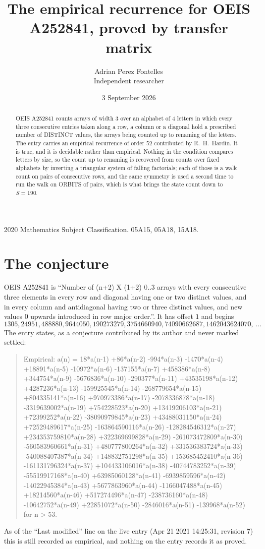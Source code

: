 \documentclass[11pt,a4paper]{article}
\title{The empirical recurrence for OEIS A252841, proved by transfer matrix}
\author{Adrian Perez Fontelles\\ \small Independent researcher}
\date{3 September 2026}
\theoremstyle{plain}
\theoremstyle{definition}
\begin{document}
\maketitle

\begin{abstract}
OEIS A252841 counts arrays of width $3$ over an alphabet of $4$ letters in which every three
consecutive entries taken along a row, a column or a diagonal hold a prescribed number of
DISTINCT values, the arrays being counted up to renaming of the letters. The entry carries an
empirical recurrence of order $52$ contributed by R.~H.~Hardin. It is true, and it is
decidable rather than empirical. Nothing in the condition compares letters by size, so the
count up to renaming is recovered from counts over fixed alphabets by inverting a triangular
system of falling factorials; each of those is a walk count on pairs of consecutive rows, and
the same symmetry is used a second time to run the walk on ORBITS of pairs, which is what
brings the state count down to $S=190$.
\end{abstract}

\noindent\small 2020 Mathematics Subject Classification. 05A15, 05A18, 15A18.\normalsize

\section{The conjecture}

OEIS A252841 is ``Number of (n+2) X (1+2) 0..3 arrays with every consecutive three elements in every row and diagonal having one or two distinct values, and in every column and antidiagonal having two or three distinct values, and new values 0 upwards introduced in row major order.''. It has offset $1$ and begins
\[
1305, 24951, 488880, 9644050, 190273279, 3754660940, 74090662687, 1462043624070,\ \dots
\]
The entry states, as a conjecture contributed by its author and never marked settled:
\begin{quote}
Empirical: a(n) = 18*a(n-1) +86*a(n-2) -994*a(n-3) -1470*a(n-4) +18891*a(n-5) -10972*a(n-6) -137155*a(n-7) +458386*a(n-8) +344754*a(n-9) -5676836*a(n-10) -290377*a(n-11) +43535198*a(n-12) +4287236*a(n-13) -159925545*a(n-14) -268779654*a(n-15) +804335141*a(n-16) +970973386*a(n-17) -2078336878*a(n-18) -3319639002*a(n-19) +754228523*a(n-20) +13419206103*a(n-21) +72399252*a(n-22) -38090979845*a(n-23) +43488031150*a(n-24) +72529489617*a(n-25) -163864590116*a(n-26) -128284546312*a(n-27) +234353759810*a(n-28) +322369699828*a(n-29) -261073472809*a(n-30) -560583960661*a(n-31) +480777800264*a(n-32) +331536383724*a(n-33) -540088407387*a(n-34) +148832751298*a(n-35) +153685452410*a(n-36) -161131796324*a(n-37) +104433106016*a(n-38) -40744783252*a(n-39) -55519917168*a(n-40) +63985060128*a(n-41) -6939859596*a(n-42) -14022945384*a(n-43) +5677863960*a(n-44) -1166047488*a(n-45) +18214560*a(n-46) +517274496*a(n-47) -238736160*a(n-48) -10642752*a(n-49) +22851072*a(n-50) -2846016*a(n-51) -139968*a(n-52) for n > 53.
\end{quote}
As of the ``Last modified'' line on the live entry (Apr 21 2021 14:25:31, revision 7) this is still
recorded as empirical, and nothing on the entry records it as proved.
\end{document}
